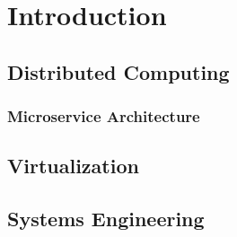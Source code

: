 \chapter{Introduction}

\section{Distributed Computing}
\subsection{Microservice Architecture}

\section{Virtualization}

\section{Systems Engineering}
